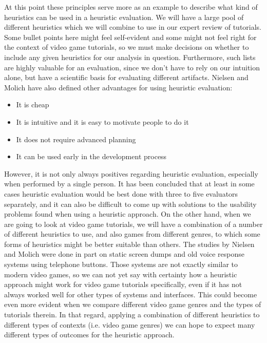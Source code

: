 At this point these principles serve more as an example to describe what kind of heuristics can be used in a heuristic evaluation. We will have a large pool of different heuristics which we will combine to use in our expert review of tutorials. Some bullet points here might feel self-evident and some might not feel right for the context of video game tutorials, so we must make decisions on whether to include any given heuristics for our analysis in question. Furthermore, such lists are highly valuable for an evaluation, since we don't have to rely on our intuition alone, but have a scientific basis for evaluating different artifacts. Nielsen and Molich have also defined other advantages for using heuristic evaluation: \cite{Nielsen1990}

\begin{itemize}
	\item It is cheap
	\item It is intuitive and it is easy to motivate people to do it
	\item It does not require advanced planning
	\item It can be used early in the development process
\end{itemize}

However, it is not only always positives regarding heuristic evaluation, especially when performed by a single person. It has been concluded that at least in some cases heuristic evaluation would be best done with three to five evaluators separately, and it can also be difficult to come up with solutions to the usability problems found when using a heuristic approach. \cite{Nielsen1990} On the other hand, when we are going to look at video game tutorials, we will have a combination of a number of different heuristics to use, and also games from different genres, to which some forms of heuristics might be better suitable than others. The studies by Nielsen and Molich were done in part on static screen dumps and old voice response systems using telephone buttons. Those systems are not exactly similar to modern video games, so we can not yet say with certainty how a heuristic approach might work for video game tutorials specifically, even if it has not always worked well for other types of systems and interfaces. This could become even more evident when we compare different video game genres and the types of tutorials therein. In that regard, applying a combination of different heuristics to different types of contexts (i.e. video game genres) we can hope to expect many different types of outcomes for the heuristic approach.

